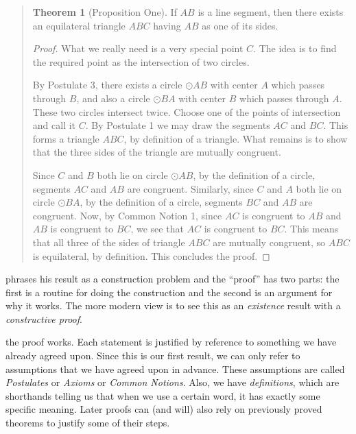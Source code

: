 \documentclass{tufte-handout}
\theoremstyle{definition}
\newtheorem*{theorem}{Theorem}
\begin{document}
\begin{quotation}
\begin{theorem}[Proposition One] 
If $AB$ is a line segment, then there exists an equilateral triangle $ABC$ having $AB$ as one of its sides.
\end{theorem}

\begin{proof} 
What we really need is a very special point $C$. 
The idea is to find the required point as the intersection of two circles.

By Postulate 3, there exists a circle $\odot AB$ with center $A$ which passes through $B$, and also a circle $\odot BA$ with center $B$ which passes through $A$. 
These two circles intersect twice.
Choose one of the points of intersection and call it $C$.
By Postulate 1 we may draw the segments $AC$ and $BC$.
This forms a triangle $ABC$, by definition of a triangle.
What remains is to show that the three sides of the triangle are mutually congruent.

Since $C$ and $B$ both lie on circle $\odot AB$, by the definition of a circle, segments $AC$ and $AB$ are congruent.
Similarly, since $C$ and $A$ both lie on circle $\odot BA$, by the definition of a circle, segments $BC$ and $AB$ are congruent. 
Now, by Common Notion 1, since $AC$ is congruent to $AB$ and $AB$ is congruent to $BC$, we see that $AC$ is congruent to $BC$. 
This means that all three of the sides of triangle $ABC$ are mutually congruent, so $ABC$ is equilateral, by definition. 
This concludes the proof.
\end{proof}
\end{quotation}

 phrases his result as a construction problem and the ``proof'' has two parts: the first is a routine for doing the construction and the second is an argument for why it works. 
The more modern view is to see this as an \emph{existence} result with a \emph{constructive proof}.



 the proof works. 
Each statement is justified by reference to something we have already agreed upon. 
Since this is our first result, we can only refer to assumptions that we have agreed upon in advance. 
These assumptions are called \emph{Postulates} or \emph{Axioms} or \emph{Common Notions}. 
Also, we have \emph{definitions}, which are shorthands telling us that when we use a certain word, it has exactly some specific meaning.
Later proofs can (and will) also rely on previously proved theorems to justify some of their steps.
\end{document}

